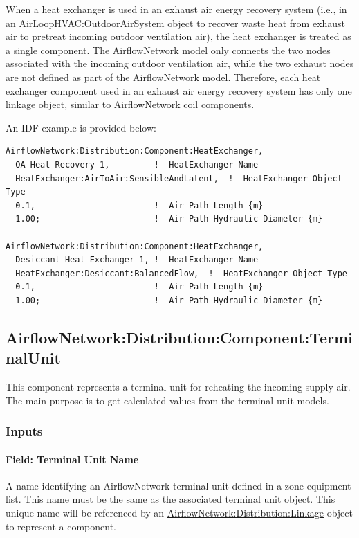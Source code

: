 When a heat exchanger is used in an exhaust air energy recovery system (i.e., in an \hyperref[airloophvacoutdoorairsystem]{AirLoopHVAC:OutdoorAirSystem} object to recover waste heat from exhaust air to pretreat incoming outdoor ventilation air), the heat exchanger is treated as a single component. The AirflowNetwork model only connects the two nodes associated with the incoming outdoor ventilation air, while the two exhaust nodes are not defined as part of the AirflowNetwork model. Therefore, each heat exchanger component used in an exhaust air energy recovery system has only one linkage object, similar to AirflowNetwork coil components.

An IDF example is provided below:

\begin{lstlisting}
AirflowNetwork:Distribution:Component:HeatExchanger,
  OA Heat Recovery 1,         !- HeatExchanger Name
  HeatExchanger:AirToAir:SensibleAndLatent,  !- HeatExchanger Object Type
  0.1,                        !- Air Path Length {m}
  1.00;                       !- Air Path Hydraulic Diameter {m}

AirflowNetwork:Distribution:Component:HeatExchanger,
  Desiccant Heat Exchanger 1, !- HeatExchanger Name
  HeatExchanger:Desiccant:BalancedFlow,  !- HeatExchanger Object Type
  0.1,                        !- Air Path Length {m}
  1.00;                       !- Air Path Hydraulic Diameter {m}
\end{lstlisting}

\subsection{AirflowNetwork:Distribution:Component:TerminalUnit}\label{airflownetworkdistributioncomponentterminalunit}

This component represents a terminal unit for reheating the incoming supply air. The main purpose is to get calculated values from the terminal unit models.

\subsubsection{Inputs}\label{inputs-19}

\paragraph{Field: Terminal Unit Name}\label{field-terminal-unit-name}

A name identifying an AirflowNetwork terminal unit defined in a zone equipment list. This name must be the same as the associated terminal unit object. This unique name will be referenced by an \hyperref[airflownetworkdistributionlinkage]{AirflowNetwork:Distribution:Linkage} object to represent a component.

